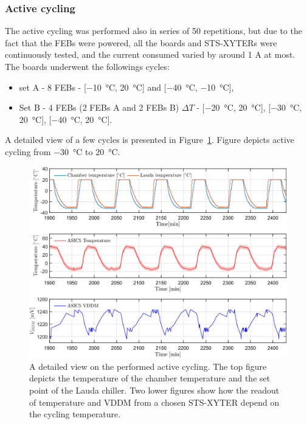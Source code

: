 \subsubsection{Active cycling}
The active cycling was performed also in series of 50 repetitions, but due to the fact that the \glspl{FEB} were powered, all the boards and STS-XYTERs were continuously tested, and the current consumed varied by around 1 A at most. The boards underwent the followings cycles:
\begin{itemize}
    \item set A - 8 \glspl{FEB} - [\SI{-10}{\celsius}, \SI{20}{\celsius}] and [\SI{-40}{\celsius}, \SI{-10}{\celsius}],
    \item Set B - 4 \glspl{FEB} (2 \glspl{FEB} A and 2 \glspl{FEB} B)  $\Delta T$ - [\SI{-20}{\celsius}, \SI{20}{\celsius}], [\SI{-30}{\celsius}, \SI{20}{\celsius}], [\SI{-40}{\celsius}, \SI{20}{\celsius}].
\end{itemize}
A detailed view of a few cycles is presented in Figure~\ref{fig_active_detailed}. Figure depicts active cycling from \SI{-30}{\celsius} to \SI{20}{\celsius}.
\begin{figure}[!h]
\centering
\includegraphics[width=0.65\columnwidth]{Chapter4/images/FEB0ASIC5COMP.png}
\caption{A detailed view on the performed active cycling. The top figure depicts the temperature of the chamber temperature and the set point of the Lauda chiller. Two lower figures show how the readout of temperature and VDDM from a chosen STS-XYTER depend on the cycling temperature. }
\label{fig_active_detailed}
\end{figure}


